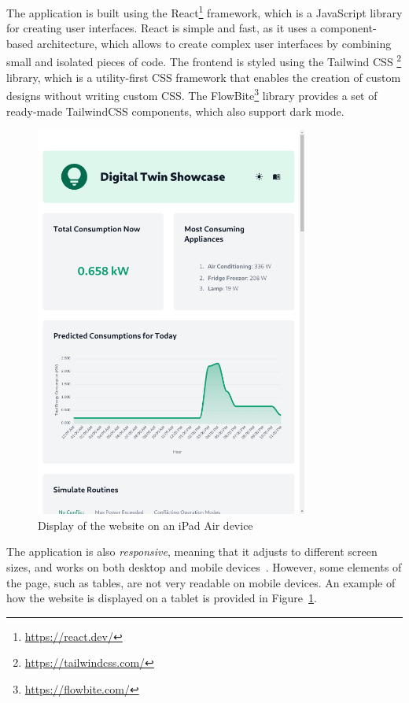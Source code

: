 The application is built using the React\footnote{\url{https://react.dev/}} framework, which is a JavaScript library for creating user interfaces. React is simple and fast, as it uses a component-based architecture, which allows to create complex user interfaces by combining small and isolated pieces of code. The frontend is styled using the Tailwind CSS \footnote{\url{https://tailwindcss.com/}} library, which is a utility-first CSS framework that enables the creation of custom designs without writing custom CSS. The FlowBite\footnote{\url{https://flowbite.com/}} library provides a set of ready-made TailwindCSS components, which also support dark mode.

\begin{figure}
    \centering
    \includegraphics[width=0.8\textwidth]{images/frontend/responsive.png}
    \caption{Display of the website on an iPad Air device}
    \label{fig:frontend_responsive}
\end{figure}

The application is also \textit{responsive}, meaning that it adjusts to different screen sizes, and works on both desktop and mobile devices~\parencite{marcotteResponsiveWebDesign2010}. However, some elements of the page, such as tables, are not very readable on mobile devices. An example of how the website is displayed on a tablet is provided in Figure~\ref{fig:frontend_responsive}. 


